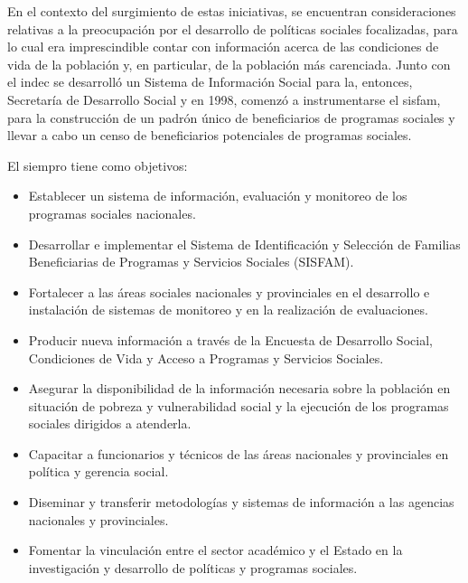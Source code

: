 En el contexto del surgimiento de estas iniciativas, se encuentran consideraciones relativas a la preocupación por el desarrollo de políticas sociales focalizadas, para lo cual era imprescindible contar con información acerca de las condiciones de vida de la población y, en particular, de la población más carenciada. Junto con el \ac{indec} se desarrolló un Sistema de Información Social para la, entonces, Secretaría de Desarrollo Social y en 1998, comenzó a instrumentarse el \ac{sisfam}, para la construcción de un padrón único de beneficiarios de programas sociales y llevar a cabo un censo de beneficiarios potenciales de programas sociales.

El \ac{siempro} tiene como objetivos: 

    \begin{itemize}
        \item Establecer un sistema de información, evaluación y monitoreo de los programas sociales nacionales.
        \item Desarrollar e implementar el Sistema de Identificación y Selección de Familias Beneficiarias de Programas y Servicios Sociales (SISFAM).
        \item Fortalecer a las áreas sociales nacionales y provinciales en el desarrollo e instalación de sistemas de monitoreo y en la realización de evaluaciones.
        \item Producir nueva información a través de la Encuesta de Desarrollo Social, Condiciones de Vida y Acceso a Programas y Servicios Sociales.
        \item Asegurar la disponibilidad de la información necesaria sobre la población en situación de pobreza y vulnerabilidad social y la ejecución de los programas sociales dirigidos a atenderla.
        \item Capacitar a funcionarios y técnicos de las áreas nacionales y provinciales en política y gerencia social.
        \item Diseminar y transferir metodologías y sistemas de información a las agencias nacionales y provinciales.
        \item Fomentar la vinculación entre el sector académico y el Estado en la investigación y desarrollo de políticas y programas sociales.
    \end{itemize}

